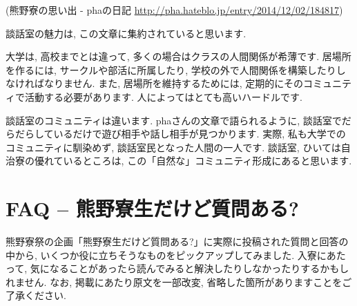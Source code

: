 \documentclass[10pt,b5jsbook,dvips,dvipdfmx,openany]{jsbook}
\theoremstyle{definition}
\begin{document}
		(熊野寮の思い出 - phaの日記 \url{http://pha.hateblo.jp/entry/2014/12/02/184817}) 

		談話室の魅力は, この文章に集約されていると思います. 

		大学は, 高校までとは違って, 多くの場合はクラスの人間関係が希薄です. 居場所を作るには, サークルや部活に所属したり, 学校の外で人間関係を構築したりしなければなりません. また, 居場所を維持するためには, 定期的にそのコミュニティで活動する必要があります. 人によってはとても高いハードルです. 

		談話室のコミュニティは違います. phaさんの文章で語られるように, 談話室でだらだらしているだけで遊び相手や話し相手が見つかります. 実際, 私も大学でのコミュニティに馴染めず, 談話室民となった人間の一人です. 談話室, ひいては自治寮の優れているところは, この「自然な」コミュニティ形成にあると思います. 



\chapter{FAQ -- 熊野寮生だけど質問ある?}
熊野寮祭の企画「熊野寮生だけど質問ある?」に実際に投稿された質問と回答の中から, いくつか役に立ちそうなものをピックアップしてみました. 入寮にあたって, 気になることがあったら読んでみると解決したりしなかったりするかもしれません. なお, 掲載にあたり原文を一部改変, 省略した箇所がありますことをご了承ください. 
\end{document}
